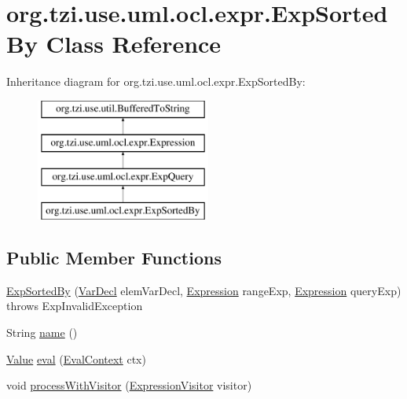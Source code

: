 \hypertarget{classorg_1_1tzi_1_1use_1_1uml_1_1ocl_1_1expr_1_1_exp_sorted_by}{\section{org.\-tzi.\-use.\-uml.\-ocl.\-expr.\-Exp\-Sorted\-By Class Reference}
\label{classorg_1_1tzi_1_1use_1_1uml_1_1ocl_1_1expr_1_1_exp_sorted_by}
}
Inheritance diagram for org.\-tzi.\-use.\-uml.\-ocl.\-expr.\-Exp\-Sorted\-By\-:\begin{figure}[H]
\begin{center}
\leavevmode
\includegraphics[height=4.000000cm]{classorg_1_1tzi_1_1use_1_1uml_1_1ocl_1_1expr_1_1_exp_sorted_by}
\end{center}
\end{figure}
\subsection*{Public Member Functions}
\begin{DoxyCompactItemize}
\item 
\hyperlink{classorg_1_1tzi_1_1use_1_1uml_1_1ocl_1_1expr_1_1_exp_sorted_by_af7c4c3bf3625df768665ca0a97c6b407}{Exp\-Sorted\-By} (\hyperlink{classorg_1_1tzi_1_1use_1_1uml_1_1ocl_1_1expr_1_1_var_decl}{Var\-Decl} elem\-Var\-Decl, \hyperlink{classorg_1_1tzi_1_1use_1_1uml_1_1ocl_1_1expr_1_1_expression}{Expression} range\-Exp, \hyperlink{classorg_1_1tzi_1_1use_1_1uml_1_1ocl_1_1expr_1_1_expression}{Expression} query\-Exp)  throws Exp\-Invalid\-Exception     
\item 
String \hyperlink{classorg_1_1tzi_1_1use_1_1uml_1_1ocl_1_1expr_1_1_exp_sorted_by_a9e5d803aa64d0e5ff5a3edc7bd754ff6}{name} ()
\item 
\hyperlink{classorg_1_1tzi_1_1use_1_1uml_1_1ocl_1_1value_1_1_value}{Value} \hyperlink{classorg_1_1tzi_1_1use_1_1uml_1_1ocl_1_1expr_1_1_exp_sorted_by_ae5405b894f637fccf40c585f52a87e88}{eval} (\hyperlink{classorg_1_1tzi_1_1use_1_1uml_1_1ocl_1_1expr_1_1_eval_context}{Eval\-Context} ctx)
\item 
void \hyperlink{classorg_1_1tzi_1_1use_1_1uml_1_1ocl_1_1expr_1_1_exp_sorted_by_ad5617bc4a0de93721fe255e7ae5be3a9}{process\-With\-Visitor} (\hyperlink{interfaceorg_1_1tzi_1_1use_1_1uml_1_1ocl_1_1expr_1_1_expression_visitor}{Expression\-Visitor} visitor)
\end{DoxyCompactItemize}
